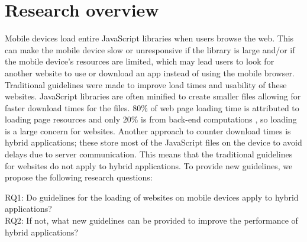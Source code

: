 \documentclass{acm_proc_article-sp}
\begin{document}
\maketitle




\section{Research overview}
Mobile devices load entire JavaScript libraries when users browse the web.
This can make the mobile device slow or unresponsive if the library is large and/or if the mobile device’s resources are limited, which may lead users to look for another website to use or download an app instead of using the mobile browser.
Traditional guidelines were made to improve load times and usability of these websites.
JavaScript libraries are often minified to create smaller files allowing for faster download times for the files.
80\% of web page loading time is attributed to loading page resources and only 20\% is from back-end computations \cite{souders2008high}, so loading is a large concern for websites.
Another approach to counter download times is hybrid applications; these store most of the JavaScript files on the device to avoid delays due to server communication.
This means that the traditional guidelines for websites do not apply to hybrid applications.
 To provide new guidelines, we propose the following research questions:

RQ1: Do guidelines for the loading of websites on mobile devices apply to hybrid applications?\\
RQ2: If not, what new guidelines can be provided to improve the performance of hybrid applications?
\end{document}
